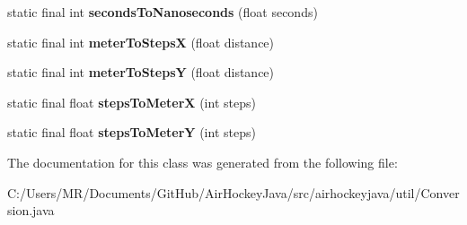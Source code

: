 \begin{DoxyCompactItemize}
\item 
\hypertarget{classairhockeyjava_1_1util_1_1_conversion_a3f91528383add9356de1717b08319be7}{}static final int {\bfseries seconds\+To\+Nanoseconds} (float seconds)\label{classairhockeyjava_1_1util_1_1_conversion_a3f91528383add9356de1717b08319be7}

\item 
\hypertarget{classairhockeyjava_1_1util_1_1_conversion_a6a3ea6c425468d29fc72327467bdb3fa}{}static final int {\bfseries meter\+To\+Steps\+X} (float distance)\label{classairhockeyjava_1_1util_1_1_conversion_a6a3ea6c425468d29fc72327467bdb3fa}

\item 
\hypertarget{classairhockeyjava_1_1util_1_1_conversion_a4bf11b01697817bf35e113b8dde0253a}{}static final int {\bfseries meter\+To\+Steps\+Y} (float distance)\label{classairhockeyjava_1_1util_1_1_conversion_a4bf11b01697817bf35e113b8dde0253a}

\item 
\hypertarget{classairhockeyjava_1_1util_1_1_conversion_a7ad0c8daedb9cda2cec61f3406e74580}{}static final float {\bfseries steps\+To\+Meter\+X} (int steps)\label{classairhockeyjava_1_1util_1_1_conversion_a7ad0c8daedb9cda2cec61f3406e74580}

\item 
\hypertarget{classairhockeyjava_1_1util_1_1_conversion_ae3f6ea486a4bafeff5c04da2483993e3}{}static final float {\bfseries steps\+To\+Meter\+Y} (int steps)\label{classairhockeyjava_1_1util_1_1_conversion_ae3f6ea486a4bafeff5c04da2483993e3}

\end{DoxyCompactItemize}


The documentation for this class was generated from the following file\+:\begin{DoxyCompactItemize}
\item 
C\+:/\+Users/\+M\+R/\+Documents/\+Git\+Hub/\+Air\+Hockey\+Java/src/airhockeyjava/util/Conversion.\+java\end{DoxyCompactItemize}
